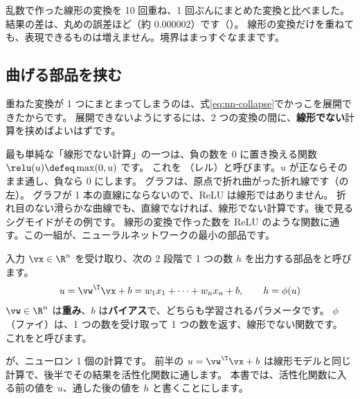 乱数で作った線形の変換を 10 回重ね、1 回ぶんにまとめた変換と比べました。
結果の差は、丸めの誤差ほど（約 0.000002）です（）。
線形の変換だけを重ねても、表現できるものは増えません。境界はまっすぐなままです。

\subsection*{曲げる部品を挟む}

重ねた変換が 1 つにまとまってしまうのは、式\eqref{eq:nn-collapse}でかっこを展開できたからです。
展開できないようにするには、2 つの変換の間に、\textbf{線形でない}計算を挟めばよいはずです。

最も単純な「線形でない計算」の一つは、負の数を 0 に置き換える関数 $\relu(u)\defeq\max(0,u)$ です。
これを （レル）と呼びます。$u$ が正ならそのまま通し、負なら 0 にします。
グラフは、原点で折れ曲がった折れ線です（の左）。
グラフが 1 本の直線にならないので、ReLU は線形ではありません。
折れ目のない滑らかな曲線でも、直線でなければ、線形でない計算です。後で見るシグモイドがその例です。
線形の変換で作った数を ReLU のような関数に通す。この一組が、ニューラルネットワークの最小の部品です。

\begin{definition}[ニューロンと活性化関数]\label{def:nn-neuron}
入力 $\vx\in\R^{n}$ を受け取り、次の 2 段階で 1 つの数 $h$ を出力する部品をと呼びます。
\begin{equation}
u=\vw^\T\vx+b=w_1x_1+\dots+w_nx_n+b,\qquad h=\phi(u)
\label{eq:nn-neuron}
\end{equation}
$\vw\in\R^{n}$ は\textbf{重み}、$b$ は\textbf{バイアス}で、どちらも学習されるパラメータです。
$\phi$（ファイ）は、1 つの数を受け取って 1 つの数を返す、線形でない関数です。
これをと呼びます。
\end{definition}

が、ニューロン 1 個の計算です。
前半の $u=\vw^\T\vx+b$ は線形モデルと同じ計算で、後半でその結果を活性化関数に通します。
本書では、活性化関数に入る前の値を $u$、通した後の値を $h$ と書くことにします。

